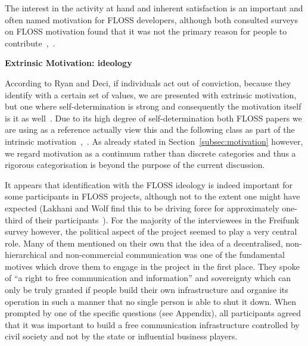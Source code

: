 The interest in the activity at hand and inherent satisfaction is an important and often named motivation for FLOSS developers, although both consulted surveys on FLOSS motivation found that it was not the primary reason for people to contribute~\cite{HarOu2002},~\cite{LakWo2005}.


\textbf{Extrinsic Motivation: ideology}

According to Ryan and Deci, if individuals act out of conviction, because they identify with a certain set of values, we are presented with extrinsic motivation, but one where self-determination is strong and consequently the motivation itself is it as well~\cite{RyDe2000}.
Due to its high degree of self-determination both FLOSS papers we are using as a reference actually view this and the following class as part of the intrinsic motivation~\cite{LakWo2005},~\cite{HarOu2002}.
As already stated in Section~\ref{subsec:motivation} however, we regard motivation as a continuum rather than discrete categories and thus a rigorous categorisation is beyond the purpose of the current discussion.

It appears that identification with the FLOSS ideology is indeed important for some participants in FLOSS projects, although not to the extent one might have expected (Lakhani and Wolf find this to be driving force for approximately one-third of their participants~\cite{LakWo2005}).
For the majority of the interviewees in the Freifunk survey however, the political aspect of the project seemed to play a very central role.
Many of them mentioned on their own that the idea of a decentralised, non-hierarchical and non-commercial communication was one of the fundamental motives which drove them to engage in the project in the first place.
They spoke of ``a right to free communication and information'' and sovereignty which can only be truly granted if people build their own infrastructure and organise its operation in such a manner that no single person is able to shut it down.
When prompted by one of the specific questions (see Appendix), all participants agreed that it was important to build a free communication infrastructure controlled by civil society and not by the state or influential business players.

